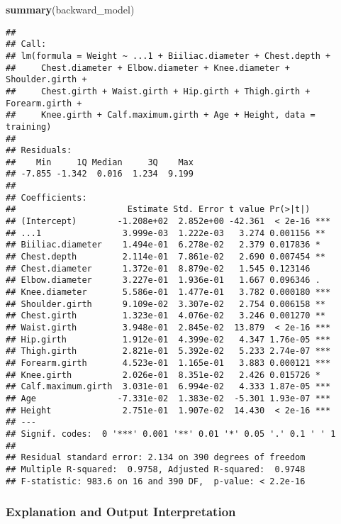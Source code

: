 \documentclass[
]{article}
\newenvironment{Shaded}{\begin{snugshade}}{\end{snugshade}}
\newcommand{\FunctionTok}[1]{\textcolor[rgb]{0.13,0.29,0.53}{\textbf{#1}}}
\newcommand{\NormalTok}[1]{#1}
\begin{document}
\begin{Shaded}
\begin{Highlighting}[]
\FunctionTok{summary}\NormalTok{(backward\_model)}
\end{Highlighting}
\end{Shaded}

\begin{verbatim}
## 
## Call:
## lm(formula = Weight ~ ...1 + Biiliac.diameter + Chest.depth + 
##     Chest.diameter + Elbow.diameter + Knee.diameter + Shoulder.girth + 
##     Chest.girth + Waist.girth + Hip.girth + Thigh.girth + Forearm.girth + 
##     Knee.girth + Calf.maximum.girth + Age + Height, data = training)
## 
## Residuals:
##    Min     1Q Median     3Q    Max 
## -7.855 -1.342  0.016  1.234  9.199 
## 
## Coefficients:
##                      Estimate Std. Error t value Pr(>|t|)    
## (Intercept)        -1.208e+02  2.852e+00 -42.361  < 2e-16 ***
## ...1                3.999e-03  1.222e-03   3.274 0.001156 ** 
## Biiliac.diameter    1.494e-01  6.278e-02   2.379 0.017836 *  
## Chest.depth         2.114e-01  7.861e-02   2.690 0.007454 ** 
## Chest.diameter      1.372e-01  8.879e-02   1.545 0.123146    
## Elbow.diameter      3.227e-01  1.936e-01   1.667 0.096346 .  
## Knee.diameter       5.586e-01  1.477e-01   3.782 0.000180 ***
## Shoulder.girth      9.109e-02  3.307e-02   2.754 0.006158 ** 
## Chest.girth         1.323e-01  4.076e-02   3.246 0.001270 ** 
## Waist.girth         3.948e-01  2.845e-02  13.879  < 2e-16 ***
## Hip.girth           1.912e-01  4.399e-02   4.347 1.76e-05 ***
## Thigh.girth         2.821e-01  5.392e-02   5.233 2.74e-07 ***
## Forearm.girth       4.523e-01  1.165e-01   3.883 0.000121 ***
## Knee.girth          2.026e-01  8.351e-02   2.426 0.015726 *  
## Calf.maximum.girth  3.031e-01  6.994e-02   4.333 1.87e-05 ***
## Age                -7.331e-02  1.383e-02  -5.301 1.93e-07 ***
## Height              2.751e-01  1.907e-02  14.430  < 2e-16 ***
## ---
## Signif. codes:  0 '***' 0.001 '**' 0.01 '*' 0.05 '.' 0.1 ' ' 1
## 
## Residual standard error: 2.134 on 390 degrees of freedom
## Multiple R-squared:  0.9758, Adjusted R-squared:  0.9748 
## F-statistic: 983.6 on 16 and 390 DF,  p-value: < 2.2e-16
\end{verbatim}

\hypertarget{explanation-and-output-interpretation}{%
\subsubsection{Explanation and Output
Interpretation}\label{explanation-and-output-interpretation}}
\end{document}
